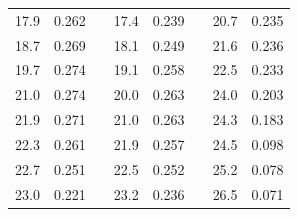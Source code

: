 \documentclass[a4paper,12pt]{article} %
\begin{document}
\begin{table}[h!]
\begin{tabular}{cclcclcc}
				\multicolumn{1}{|c|}{17.9}               & \multicolumn{1}{c|}{0.262} & \multicolumn{1}{l|}{} & \multicolumn{1}{c|}{17.4}       & \multicolumn{1}{c|}{0.239} & \multicolumn{1}{l|}{} & \multicolumn{1}{c|}{20.7}       & \multicolumn{1}{c|}{0.235} \\ \cline{1-2} \cline{4-5} \cline{7-8} 
				\multicolumn{1}{|c|}{18.7}               & \multicolumn{1}{c|}{0.269} & \multicolumn{1}{l|}{} & \multicolumn{1}{c|}{18.1}       & \multicolumn{1}{c|}{0.249} & \multicolumn{1}{l|}{} & \multicolumn{1}{c|}{21.6}       & \multicolumn{1}{c|}{0.236} \\ \cline{1-2} \cline{4-5} \cline{7-8} 
				\multicolumn{1}{|c|}{19.7}               & \multicolumn{1}{c|}{0.274} & \multicolumn{1}{l|}{} & \multicolumn{1}{c|}{19.1}       & \multicolumn{1}{c|}{0.258} & \multicolumn{1}{l|}{} & \multicolumn{1}{c|}{22.5}       & \multicolumn{1}{c|}{0.233} \\ \cline{1-2} \cline{4-5} \cline{7-8} 
				\multicolumn{1}{|c|}{21.0}               & \multicolumn{1}{c|}{0.274} & \multicolumn{1}{l|}{} & \multicolumn{1}{c|}{20.0}       & \multicolumn{1}{c|}{0.263} & \multicolumn{1}{l|}{} & \multicolumn{1}{c|}{24.0}       & \multicolumn{1}{c|}{0.203} \\ \cline{1-2} \cline{4-5} \cline{7-8} 
				\multicolumn{1}{|c|}{21.9}               & \multicolumn{1}{c|}{0.271} & \multicolumn{1}{l|}{} & \multicolumn{1}{c|}{21.0}       & \multicolumn{1}{c|}{0.263} & \multicolumn{1}{l|}{} & \multicolumn{1}{c|}{24.3}       & \multicolumn{1}{c|}{0.183} \\ \cline{1-2} \cline{4-5} \cline{7-8} 
				\multicolumn{1}{|c|}{22.3}               & \multicolumn{1}{c|}{0.261} & \multicolumn{1}{l|}{} & \multicolumn{1}{c|}{21.9}       & \multicolumn{1}{c|}{0.257} & \multicolumn{1}{l|}{} & \multicolumn{1}{c|}{24.5}       & \multicolumn{1}{c|}{0.098} \\ \cline{1-2} \cline{4-5} \cline{7-8} 
				\multicolumn{1}{|c|}{22.7}               & \multicolumn{1}{c|}{0.251} & \multicolumn{1}{l|}{} & \multicolumn{1}{c|}{22.5}       & \multicolumn{1}{c|}{0.252} & \multicolumn{1}{l|}{} & \multicolumn{1}{c|}{25.2}       & \multicolumn{1}{c|}{0.078} \\ \cline{1-2} \cline{4-5} \cline{7-8} 
				\multicolumn{1}{|c|}{23.0}               & \multicolumn{1}{c|}{0.221} & \multicolumn{1}{l|}{} & \multicolumn{1}{c|}{23.2}       & \multicolumn{1}{c|}{0.236} & \multicolumn{1}{l|}{} & \multicolumn{1}{c|}{26.5}       & \multicolumn{1}{c|}{0.071} \\ \cline{1-2} \cline{4-5} \cline{7-8} 

\end{tabular}
\end{table}
\end{document}
